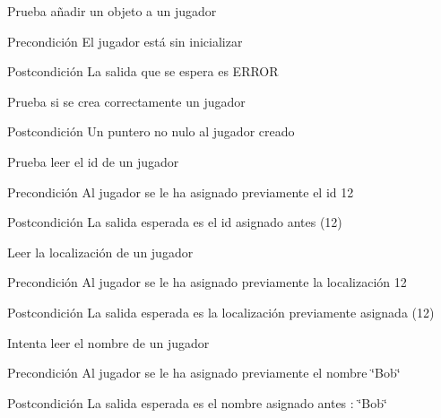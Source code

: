 \begin{DoxyRefList}
\item[\label{test__test000222}%
\hypertarget{test__test000222}{}%
Global \hyperlink{player__test_8c_a14a3e4867e2ad3287c8efa99cd36904e}{test1\-\_\-player\-\_\-add\-\_\-object} ()]Prueba añadir un objeto a un jugador \begin{DoxyPrecond}{Precondición}
El jugador está sin inicializar 
\end{DoxyPrecond}
\begin{DoxyPostcond}{Postcondición}
La salida que se espera es E\-R\-R\-O\-R  
\end{DoxyPostcond}

\item[\label{test__test000203}%
\hypertarget{test__test000203}{}%
Global \hyperlink{player__test_8c_ab29768452373e16bb6aaa1f7998f62fb}{test1\-\_\-player\-\_\-create} ()]Prueba si se crea correctamente un jugador \begin{DoxyPostcond}{Postcondición}
Un puntero no nulo al jugador creado  
\end{DoxyPostcond}

\item[\label{test__test000213}%
\hypertarget{test__test000213}{}%
Global \hyperlink{player__test_8c_a790a75dc179c00c60c784d3e34c0e5aa}{test1\-\_\-player\-\_\-get\-\_\-id} ()]Prueba leer el id de un jugador \begin{DoxyPrecond}{Precondición}
Al jugador se le ha asignado previamente el id 12 
\end{DoxyPrecond}
\begin{DoxyPostcond}{Postcondición}
La salida esperada es el id asignado antes (12)  
\end{DoxyPostcond}

\item[\label{test__test000219}%
\hypertarget{test__test000219}{}%
Global \hyperlink{player__test_8c_a408a557a0cff748c10fb9a03445af191}{test1\-\_\-player\-\_\-get\-\_\-location} ()]Leer la localización de un jugador \begin{DoxyPrecond}{Precondición}
Al jugador se le ha asignado previamente la localización 12 
\end{DoxyPrecond}
\begin{DoxyPostcond}{Postcondición}
La salida esperada es la localización previamente asignada (12)  
\end{DoxyPostcond}

\item[\label{test__test000216}%
\hypertarget{test__test000216}{}%
Global \hyperlink{player__test_8c_a94068667d8faa66a4ad293dd2c60f2ef}{test1\-\_\-player\-\_\-get\-\_\-name} ()]Intenta leer el nombre de un jugador \begin{DoxyPrecond}{Precondición}
Al jugador se le ha asignado previamente el nombre \char`\"{}\-Bob\char`\"{} 
\end{DoxyPrecond}
\begin{DoxyPostcond}{Postcondición}
La salida esperada es el nombre asignado antes \-: \char`\"{}\-Bob\char`\"{}  
\end{DoxyPostcond}


\end{DoxyRefList}
